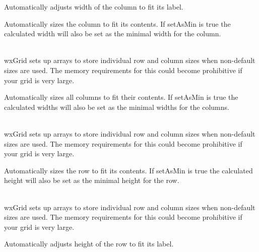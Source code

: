 Automatically adjusts width of the column to fit its label.



\label{wxgridautosizecolumn}


Automatically sizes the column to fit its contents. If setAsMin is true the calculated width will
also be set as the minimal width for the column.

\\
wxGrid sets up arrays to store individual row and column sizes when non-default sizes are used.
The memory requirements for this could become prohibitive if your grid is very large.



\label{wxgridautosizecolumns}


Automatically sizes all columns to fit their contents. If setAsMin is true the calculated widths will
also be set as the minimal widths for the columns.

\\
wxGrid sets up arrays to store individual row and column sizes when non-default sizes are used.
The memory requirements for this could become prohibitive if your grid is very large.



\label{wxgridautosizerow}


Automatically sizes the row to fit its contents. If setAsMin is true the calculated height will
also be set as the minimal height for the row.

\\
wxGrid sets up arrays to store individual row and column sizes when non-default sizes are used.
The memory requirements for this could become prohibitive if your grid is very large.



\label{wxgridautosizerowlabelsize}


Automatically adjusts height of the row to fit its label.



